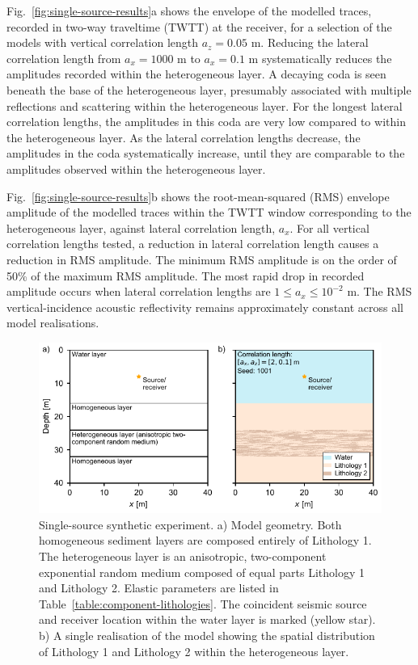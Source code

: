 \documentclass[se,manuscript]{copernicus}
\begin{document}
Fig.~\ref{fig:single-source-results}a shows the envelope of the modelled traces, recorded in two-way traveltime (TWTT) at the receiver, for a selection of the models with vertical correlation length $a_z=0.05$ \unit{m}.
Reducing the lateral correlation length from $a_x=1000$ \unit{m} to $a_x=0.1$ \unit{m} systematically reduces the amplitudes recorded within the heterogeneous layer.
A decaying coda is seen beneath the base of the heterogeneous layer, presumably associated with multiple reflections and scattering within the heterogeneous layer.
For the longest lateral correlation lengths, the amplitudes in this coda are very low compared to within the heterogeneous layer.
As the lateral correlation lengths decrease, the amplitudes in the coda systematically increase, until they are comparable to the amplitudes observed within the heterogeneous layer.

Fig.~\ref{fig:single-source-results}b shows the root-mean-squared (RMS) envelope amplitude of the modelled traces within the TWTT window corresponding to the heterogeneous layer, against lateral correlation length, $a_x$.
For all vertical correlation lengths tested, a reduction in lateral correlation length causes a reduction in RMS amplitude.
The minimum RMS amplitude is on the order of 50\% of the maximum RMS amplitude.
The most rapid drop in recorded amplitude occurs when lateral correlation lengths are $1 \leq a_x \leq 10^{-2}$ \unit{m}.
The RMS vertical-incidence acoustic reflectivity remains approximately constant across all model realisations.

\begin{figure}
    \includegraphics{figures/fig03.pdf}
    \caption{Single-source synthetic experiment.
        a) Model geometry. Both homogeneous sediment layers are composed entirely of Lithology 1.
        The heterogeneous layer is an anisotropic, two-component exponential random medium composed of equal parts Lithology 1 and Lithology 2.
        Elastic parameters are listed in Table~\ref{table:component-lithologies}.
        The coincident seismic source and receiver location within the water layer is marked (yellow star).
        b) A single realisation of the model showing the spatial distribution of Lithology 1 and Lithology 2 within the heterogeneous layer.}
    \label{fig:single-source-model}
\end{figure}
\end{document}
